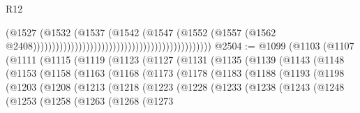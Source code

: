 \begin{lexlean}{R12}
\begin{coremodule}
                                                                                  (@1527
                                                                                    (@1532
                                                                                      (@1537
                                                                                        (@1542
                                                                                          (@1547
                                                                                            (@1552
                                                                                              (@1557
                                                                                                (@1562
                                                                                                  @2408)))))))))))))))))))))))))))))))))))))))))))))))
@2504 := @1099
    (@1103
      (@1107
        (@1111
          (@1115
            (@1119
              (@1123
                (@1127
                  (@1131
                    (@1135
                      (@1139
                        (@1143
                          (@1148
                            (@1153
                              (@1158
                                (@1163
                                  (@1168
                                    (@1173
                                      (@1178
                                        (@1183
                                          (@1188
                                            (@1193
                                              (@1198
                                                (@1203
                                                  (@1208
                                                    (@1213
                                                      (@1218
                                                        (@1223
                                                          (@1228
                                                            (@1233
                                                              (@1238
                                                                (@1243
                                                                  (@1248
                                                                    (@1253
                                                                      (@1258
                                                                        (@1263
                                                                          (@1268
                                                                            (@1273

\end{coremodule}
\end{lexlean}
